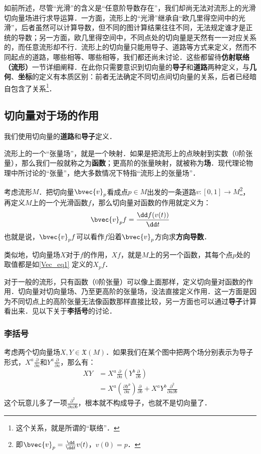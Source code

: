 如前所述，尽管“光滑”的含义是“任意阶导数存在”，我们却尚无法对流形上的光滑切向量场进行求导运算．一方面，流形上的“光滑”继承自“欧几里得空间中的光滑”，后者虽然可以计算导数，但不同的图计算结果往往不同，无法规定谁才是正统的导数；另一方面，欧几里得空间中，不同点处的切向量是天然有一一对应关系的，而任意流形却不行．流形上的切向量只能用导子、道路等方式来定义，然而不同起点的道路，哪些相等、哪些相等，我们都还尚未讨论．这些都留待\textbf{仿射联络（流形）}一节详细阐释．在此你只需要意识到切向量的\textbf{导子}和\textbf{道路}两种定义，与\textbf{几何}、\textbf{坐标}的定义有本质区别：前者无法确定不同切点间切向量的关系，后者已经暗自包含了关系\footnote{这个关系，就是所谓的“联络”．}．


\subsection{切向量对于场的作用}
我们使用切向量的\textbf{道路}和\textbf{导子}定义．

流形上的一个“张量场”，就是一个映射．如果是把流形上的点映射到实数（0阶张量），那么我们一般就称之为\textbf{函数}；更高阶的张量映射，就被称为\textbf{场}．现代理论物理中所讨论的“张量”，绝大多数情况下特指“流形上的张量场”．

考虑流形$M$．把切向量$\bvec{v}_p$看成点$p\in M$出发的一条道路$v:[0, 1]\to M$\footnote{即$\bvec{v}_p=\frac{\dd}{\dd t}v(t)$，$v(0)=p$．}，再定义$M$上的一个光滑函数$f$，那么切向量对函数的作用就定义为：
\begin{equation}\label{Vec_eq1}
\bvec{v}_pf=\frac{\dd f(v(t))}{\dd t}
\end{equation}
也就是说，$\bvec{v}_pf$可以看作$f$沿着$\bvec{v}_p$方向求\textbf{方向导数}．

类似地，切向量场$X$对于$f$的作用，$Xf$，就是$M$上的另一个函数，其每个点$p$处的取值都是如\autoref{Vec_eq1} 定义的$X_p f$．

对于一般的流形，只有函数（0阶张量）可以像上面那样，定义切向量对函数的作用．切向量对切向量场、乃至更高阶的张量场，没法直接定义作用．这一方面是因为不同切点上的高阶张量无法像函数那样直接比较，另一方面也可以通过\textbf{导子}计算看出来．见以下关于\textbf{李括号}的讨论．

\subsubsection{李括号}

考虑两个切向量场$X, Y\in\mathfrak{X}(M)$．如果我们在某个图中把两个场分别表示为导子形式，$X^a\frac{\partial}{\partial a}$和$Y^a\frac{\partial}{\partial a}$，那么有：
\begin{equation}
\begin{aligned}
XY&=X^a\frac{\partial}{\partial a}(Y^b\frac{\partial}{\partial b})\\
&=X^a(\frac{\partial Y^b}{\partial a})\frac{\partial}{\partial b}+X^aY^b\frac{\partial^2}{\partial a\partial b}
\end{aligned}
\end{equation}
这个玩意儿多了一项$\frac{\partial^2}{\partial a\partial b}$，根本就不构成导子，也就不是切向量了．

